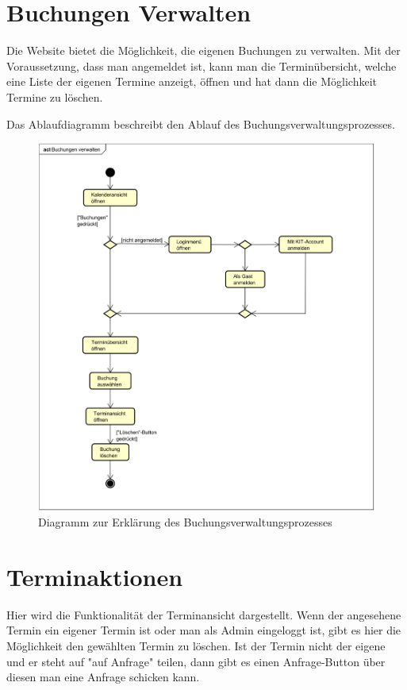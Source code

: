 \section{Buchungen Verwalten}

Die Website bietet die Möglichkeit, die eigenen Buchungen zu verwalten. Mit der Voraussetzung,
dass man angemeldet ist, kann man die Terminübersicht, welche eine Liste der eigenen Termine anzeigt,
öffnen und hat dann die Möglichkeit Termine zu löschen.

Das Ablaufdiagramm beschreibt den Ablauf des Buchungsverwaltungsprozesses.

\begin{figure}[ht]
    \centering
    \includegraphics[width=\textwidth]{figures/activity/buchungverwalten}
    \caption{Diagramm zur Erklärung des Buchungsverwaltungsprozesses}
    \label{fig:manage-booking-diagram}
\end{figure}
\clearpage

\section{Terminaktionen}

Hier wird die Funktionalität der Terminansicht dargestellt. Wenn der angesehene Termin ein eigener Termin ist
oder man als Admin eingeloggt ist, gibt es hier die Möglichkeit den gewählten Termin zu löschen. Ist der
Termin nicht der eigene und er steht auf "auf Anfrage" teilen, dann gibt es einen Anfrage-Button über diesen man
eine Anfrage schicken kann.

